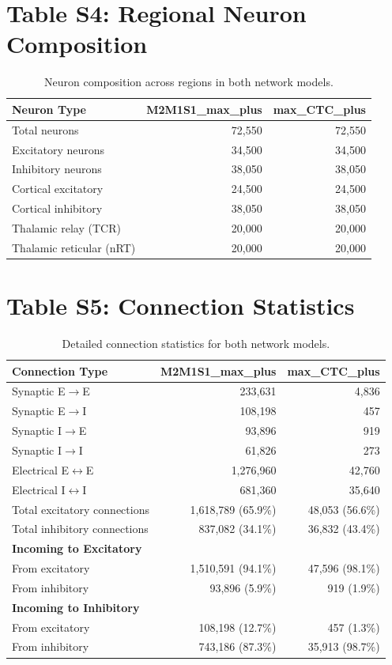 \documentclass[10pt]{article}
\begin{document}
\section*{Table S4: Regional Neuron Composition}

\begin{table}[h]
\centering
\caption{Neuron composition across regions in both network models.}
\begin{tabular}{lrr}
\toprule
\textbf{Neuron Type} & \textbf{M2M1S1\_max\_plus} & \textbf{max\_CTC\_plus} \\
\midrule
Total neurons & 72,550 & 72,550 \\
Excitatory neurons & 34,500 & 34,500 \\
Inhibitory neurons & 38,050 & 38,050 \\
Cortical excitatory & 24,500 & 24,500 \\
Cortical inhibitory & 38,050 & 38,050 \\
Thalamic relay (TCR) & 20,000 & 20,000 \\
Thalamic reticular (nRT) & 20,000 & 20,000 \\
\bottomrule
\end{tabular}
\end{table}

\section*{Table S5: Connection Statistics}

\begin{table}[h]
\centering
\caption{Detailed connection statistics for both network models.}
\begin{tabular}{lrr}
\toprule
\textbf{Connection Type} & \textbf{M2M1S1\_max\_plus} & \textbf{max\_CTC\_plus} \\
\midrule
Synaptic E$\rightarrow$E & 233,631 & 4,836 \\
Synaptic E$\rightarrow$I & 108,198 & 457 \\
Synaptic I$\rightarrow$E & 93,896 & 919 \\
Synaptic I$\rightarrow$I & 61,826 & 273 \\
Electrical E$\leftrightarrow$E & 1,276,960 & 42,760 \\
Electrical I$\leftrightarrow$I & 681,360 & 35,640 \\
Total excitatory connections & 1,618,789 (65.9\%) & 48,053 (56.6\%) \\
Total inhibitory connections & 837,082 (34.1\%) & 36,832 (43.4\%) \\
\midrule
\textbf{Incoming to Excitatory} & & \\
From excitatory & 1,510,591 (94.1\%) & 47,596 (98.1\%) \\
From inhibitory & 93,896 (5.9\%) & 919 (1.9\%) \\
\midrule
\textbf{Incoming to Inhibitory} & & \\
From excitatory & 108,198 (12.7\%) & 457 (1.3\%) \\
From inhibitory & 743,186 (87.3\%) & 35,913 (98.7\%) \\
\bottomrule
\end{tabular}
\end{table}
\end{document}
